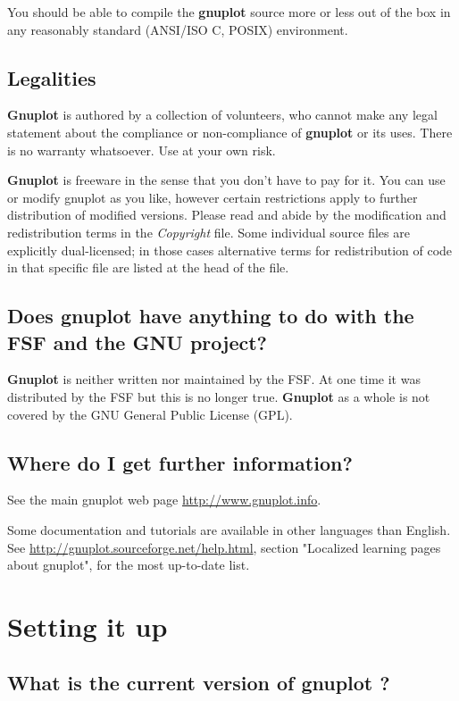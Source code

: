\documentclass[letter,11pt]{article}
\def\http#1{{\small\href{http://#1}{\url{http://#1}}}}
\newcommand{\http}[1]%
            {\htmladdnormallink{\latex{\url{http://#1}}%
                    \html{\textit{http://#1}}}%
                {http://#1}%
            }
\newcommand{\gnuplot}{\textbf{gnuplot }}
\newcommand{\Gnuplot}{\textbf{Gnuplot }}
\begin{document}
{You should be able to compile the \gnuplot source more or
less out of the box in any reasonably standard (ANSI/ISO C, POSIX)
environment.


\subsection{Legalities}

\Gnuplot{} is authored by a collection of volunteers, who cannot
make any legal statement about the compliance or non-compliance of
\gnuplot or its uses. There is no warranty whatsoever. Use at your own risk.

\Gnuplot{} is freeware in the sense that you don't have to pay for it.
You can use or modify gnuplot as you like, however certain restrictions
apply to further distribution of modified versions.
Please read and abide by the modification and redistribution terms in
the \textit{Copyright} file.  Some individual source files are explicitly
dual-licensed;  in those cases alternative terms for redistribution of code
in that specific file are listed at the head of the file.

\subsection{Does \gnuplot have anything to do with the FSF and the GNU
project?}

\Gnuplot{} is neither written nor maintained by the FSF. At one time it
was distributed by the FSF but this is no longer true. \Gnuplot{} as a whole
is not covered by the GNU General Public License (GPL).


\subsection{Where do I get further information?}

See the main gnuplot web page \http{www.gnuplot.info}.

Some documentation and tutorials are available in other languages than English.
See \http{gnuplot.sourceforge.net/help.html}, section "Localized learning pages
about gnuplot", for the most up-to-date list.


\section{Setting it up}

\subsection{What is the current version of \gnuplot?}

}
\end{document}
